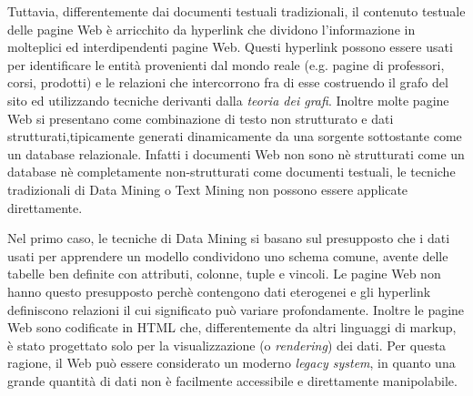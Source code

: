 Tuttavia, differentemente dai documenti testuali tradizionali, il contenuto testuale delle pagine Web è arricchito da hyperlink che dividono l'informazione in molteplici ed interdipendenti pagine Web. Questi hyperlink possono essere usati per identificare le entità provenienti dal mondo reale (e.g. pagine di professori, corsi, prodotti) e le relazioni che intercorrono fra di esse costruendo il grafo del sito ed utilizzando tecniche derivanti dalla \textit{teoria dei grafi}. Inoltre molte pagine Web si presentano come combinazione di testo non strutturato e dati strutturati,tipicamente generati dinamicamente da una sorgente sottostante come un database relazionale. Infatti i documenti Web non sono nè strutturati come un database nè completamente non-strutturati come documenti testuali, le tecniche tradizionali di Data Mining o Text Mining non possono essere applicate direttamente. 

Nel primo caso, le tecniche di Data Mining si basano sul presupposto che i dati usati per apprendere un modello condividono uno schema comune, avente delle tabelle ben definite con attributi, colonne, tuple e vincoli. Le pagine Web non hanno questo presupposto perchè contengono dati eterogenei e gli hyperlink definiscono relazioni il cui significato può variare profondamente. Inoltre le pagine Web sono codificate in HTML che, differentemente da altri linguaggi di markup, è stato progettato solo per la visualizzazione (o \textit{rendering}) dei dati. Per questa ragione, il Web può essere considerato un moderno \textit{legacy system}, in quanto una grande quantità di dati non è facilmente accessibile e direttamente manipolabile. 

